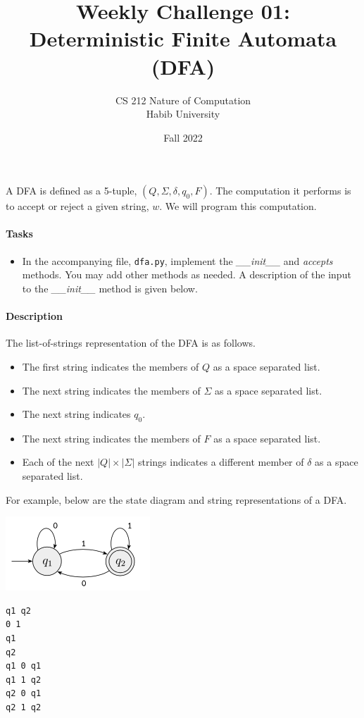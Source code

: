 \documentclass[a4paper]{exam}
\title{Weekly Challenge 01: Deterministic Finite Automata (DFA)}
\author{CS 212 Nature of Computation\\Habib University}
\date{Fall 2022}
\begin{document}
\maketitle

\begin{questions}


  A DFA is defined as a 5-tuple, $(Q, \Sigma, \delta, q_0, F)$. The computation it performs is to accept or reject a given string, $w$. We will program this computation.

  \paragraph{Tasks}
  \begin{itemize}
    \item In the accompanying file, \texttt{dfa.py}, implement the \textit{\_\_init\_\_} and \textit{accepts} methods. You may add other methods as needed. A description of the input to the \textit{\_\_init\_\_} method is given below.
  \end{itemize}

  \paragraph{Description} The list-of-strings representation of the DFA is as follows.
  \begin{itemize}
    \item The first string indicates the members of $Q$ as a space separated list.
    \item The next string indicates the members of $\Sigma$ as a space separated list.
    \item The next string indicates $q_0$.
    \item The next string indicates the members of $F$ as a space separated list.
    \item Each of the next $|Q|\times|\Sigma|$ strings indicates a different member of $\delta$ as a space separated list.
  \end{itemize}
  For example, below are the state diagram and string representations of a DFA.

  \begin{minipage}{0.6\linewidth}
    \includegraphics{example}
  \end{minipage}
  \begin{minipage}{0.2\linewidth}
    \begin{verbatim}
q1 q2
0 1
q1
q2
q1 0 q1
q1 1 q2
q2 0 q1
q2 1 q2
\end{verbatim}
  \end{minipage}


\end{questions}
\end{document}
